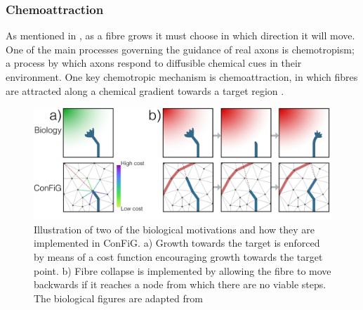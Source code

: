 \subsubsection{Chemoattraction}
\label{sec:config_chemoattraction}
As mentioned in , as a fibre grows it must choose in which direction it will move. One of the main processes governing the guidance of real axons is chemotropism; a process by which axons respond to diffusible chemical cues in their environment. One key chemotropic mechanism is chemoattraction, in which fibres are attracted along a chemical gradient towards a target region \cite{Price2017}.

\begin{figure}
  \centering
  \includegraphics[width=\textwidth]{figures/config/biological_target+cam-01.png}
  \caption[Illustration of the chemoattraction process]{Illustration of two of the biological motivations and how they are implemented in ConFiG. a) Growth towards the target is enforced by means of a cost function encouraging growth towards the target point. b) Fibre collapse is implemented by allowing the fibre to move backwards if it reaches a node from which there are no viable steps. The biological figures are adapted from \cite{Price2017}}
  \label{fig:config_chemoattraction}
\end{figure}

